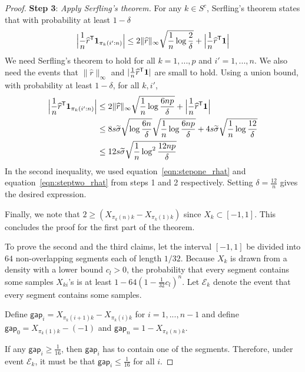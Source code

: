 \documentclass[12pt,pdftex,aos,noinfoline,addressasfootnote]{imsart}
\begin{document}
\begin{proof}
\vskip5pt
\textbf{Step 3}: {\it Apply Serfling's theorem.}  
For any $k \in S^c$, Serfling's theorem states that with probability at least $1 - \delta$
\begin{align*}
\Big
|\frac{1}{n} \widehat{r}^{\mathsf{T}} \mbox{\boldmath $1$}_{\pi_k(i':n)}\Big| \leq
   2\| \widehat{r} \|_\infty \sqrt{ \frac{1}{n} \log \frac{2}{\delta}} + 
   \Big|\frac{1}{n} \widehat{r}^{\mathsf{T}} \mbox{\boldmath $1$} \Big|
\end{align*}
We need Serfling's theorem to hold for all $k = 1,...,p$ and $i' =
1,...,n$. We also need the events that $\|\hat{r}\|_\infty$ and $|
\frac{1}{n} \widehat{r}^{\mathsf{T}} \mbox{\boldmath $1$}|$ are small to hold. Using a
union bound, with probability at least $1-\delta$, for all $k,i'$,
\begin{align*}
\Big
|\frac{1}{n} \widehat{r}^{\mathsf{T}} \mbox{\boldmath $1$}_{\pi_k(i':n)}\Big| &\leq
   2\| \widehat{r} \|_\infty \sqrt{ \frac{1}{n} \log \frac{6np}{\delta}} + 
   \Big|\frac{1}{n} \widehat{r}^{\mathsf{T}} \mbox{\boldmath $1$} \Big|\\
  &\leq 8 s\widetilde{\sigma}\sqrt{\log \frac{6n}{\delta}} \sqrt{\frac{1}{n}\log \frac{6np}{\delta}} + 4 s \widetilde{\sigma} \sqrt{\frac{1}{n}\log \frac{12}{\delta}} \\
  &\leq 12 s\widetilde{\sigma} \sqrt{ \frac{1}{n} \log^2 \frac{12np}{\delta}}
\end{align*}
In the second inequality, we used equation~\eqref{eqn:stepone_rhat}
and equation~\eqref{eqn:steptwo_rhat} from steps 1 and 2
respectively. Setting $\delta = \frac{12}{n}$ gives the desired expression.

Finally, we note that $2 \geq (X_{\pi_k(n)k} - X_{\pi_k(1)k})$ since $X_k \subset [-1,1]$. This concludes the proof for the first part of the theorem. 

To prove the second and the third claims, let the interval $[-1, 1]$ be divided into $64$ non-overlapping segments each of length $1/32$. Because $X_k$ is drawn from a density with a lower bound $c_l > 0$, the probability that every segment contains some samples $X_{ki}$'s is at least $1-64 \left( 1 - \frac{1}{32} c_l \right)^n$. Let $\mathcal{E}_k$ denote the event that every segment contains some samples. 

Define $\mathsf{gap}_i = X_{\pi_k(i+1)k} - X_{\pi_k(i)k}$ for $i=1,...,n-1$ and define $\mathsf{gap}_0 = X_{\pi_k(1)k} - (-1)$ and $\mathsf{gap}_{n} = 1 - X_{\pi_k(n)k}$. 

If any $\mathsf{gap}_i \geq \frac{1}{16}$, then $\mathsf{gap}_i$ has to contain one of the segments. Therefore, under event $\mathcal{E}_k$, it must be that $\mathsf{gap}_i \leq \frac{1}{16}$ for all $i$.


\end{proof}
\end{document}
